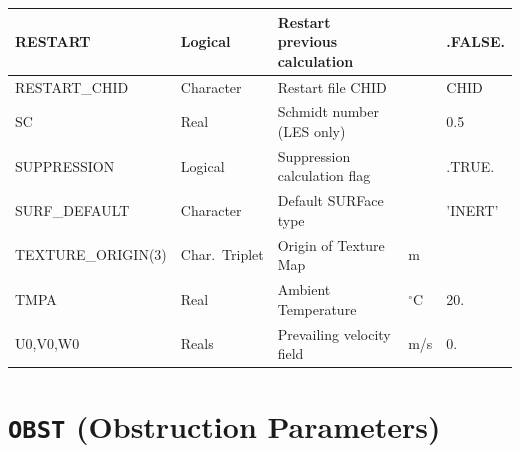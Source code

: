 \documentclass[11pt]{book}
\begin{document}
\begin{table}[H]
\begin{tabular*}{\textwidth}{@{\extracolsep{\fill}}|l|l|l|l|l|}
{\ct RESTART}               & Logical       & Restart previous calculation          &               & {\ct .FALSE.}      \\ \hline
{\ct RESTART\_CHID}         & Character     & Restart file CHID                     &               & {\ct CHID}    \\ \hline
{\ct SC}                    & Real          & Schmidt number (LES only)             &               & 0.5  \\ \hline
{\ct SUPPRESSION}           & Logical       & Suppression calculation flag          &               & {\ct .TRUE.}   \\ \hline
{\ct SURF\_DEFAULT}         & Character     & Default SURFace type                  &               & {\ct 'INERT'}    \\ \hline
{\ct TEXTURE\_ORIGIN(3)}    & Char.~Triplet & Origin of Texture Map                 & m             &   \\ \hline
{\ct TMPA}                  & Real          & Ambient Temperature                   & $^\circ$C     & 20.  \\ \hline
{\ct U0,V0,W0}              & Reals         & Prevailing velocity field             & m/s           & 0.  \\ \hline
\end{tabular*}
\end{table}

\vspace{\baselineskip}

\vfill


\section{\texorpdfstring{{\tt OBST}}{OBST} (Obstruction Parameters)}

\hspace{1in}
\end{document}
